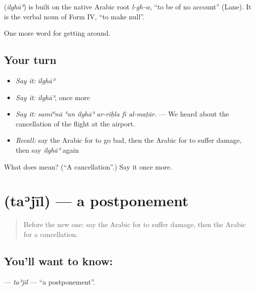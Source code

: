 \begin{cousinweb}
\textbf{} (\emph{ilghāʾ}) is built on the native Arabic root \emph{l-gh-w}, \textquotedblleft{}to be of no account\textquotedblright{} (Lane). It is the verbal noun of Form IV, \textquotedblleft{}to make null\textquotedblright{}.
\end{cousinweb}

\begin{grammarlens}[title={What you've built}]
One more word for getting around.
\end{grammarlens}

\subsection*{Your turn}
\begin{itemize}
\raggedright
  \item \emph{Say it:} \emph{ilghāʾ}
  \item \emph{Say it:} \emph{ilghāʾ}, once more
  \item \emph{Say it:} \emph{samiʿnā ʿan ilghāʾ ar-riḥla fī al-maṭār.} — We heard about the cancellation of the flight at the airport.
  \item \emph{Recall:} say the Arabic for to go bad, then the Arabic for to suffer damage, then say \emph{ilghāʾ} again
\end{itemize}

\begin{tcolorbox}[breakable,colback=teal!4,colframe=teal!35!black,title={Before you move on}]
What does  mean? (\textquotedblleft{}A cancellation\textquotedblright{}.) Say it once more.
\end{tcolorbox}
\section[\texorpdfstring{\ar{تأجيل} (taʾjīl)}{تأجيل (taʾjīl)}]{ (taʾjīl) — a postponement}

\label{lesson:AR-C461-tajil}



\begin{quote}
Before the new one: say the Arabic for to suffer damage, then the Arabic for a cancellation.
\end{quote}

\subsection*{You'll want to know: }
\textbf{} — \emph{taʾjīl} — \textquotedblleft{}a postponement\textquotedblright{}.

